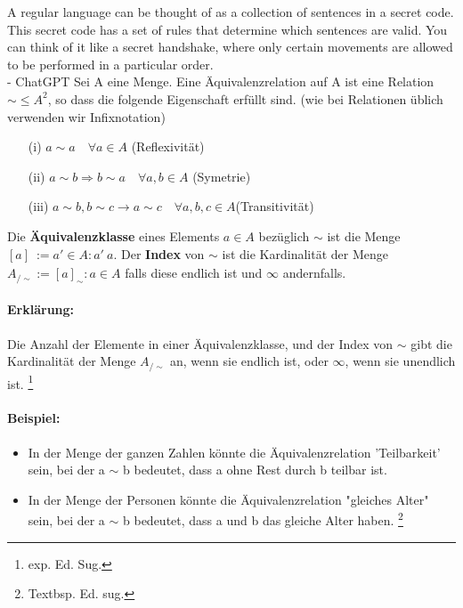 {
  A regular language can be thought of as a collection of sentences in a secret code. This secret code has a set of rules that determine which sentences are valid. You can think of it like a secret handshake, where only certain movements are allowed to be performed in a particular order.\\ \hspace*{\fill} - ChatGPT
}
  Sei A eine Menge. Eine Äquivalenzrelation auf A ist eine Relation \(\sim \leq A^{2}\), so dass die folgende Eigenschaft erfüllt sind. (wie bei Relationen üblich verwenden wir Infixnotation)
  \begin{itemize}
    \item [(i)] \(a \sim a \quad \forall a \in A\)  (Reflexivität)
    \item [(ii)] \(a \sim b \Rightarrow  b \sim a \quad \forall a, b \in A\) (Symetrie)
    \item [(iii)] \(a \sim b, b \sim c \rightarrow a \sim c \quad \forall a, b, c \in A\)(Transitivität)
  \end{itemize}
  Die \textbf{Äquivalenzklasse} eines Elements \(a \in A\) bezüglich \(\sim\) ist die Menge \([a]_{~} := {a' \in A : a' ~a}\). Der \textbf{Index} von \(\sim\) ist die Kardinalität der Menge \(A_{/\sim} := {[a]_{\sim} : a \in A}\) falls diese endlich ist und \(\infty\) andernfalls.

  \paragraph*{Erklärung:}
    Die Anzahl der Elemente in einer Äquivalenzklasse, und der Index von \(\sim\) gibt die Kardinalität der Menge \(A_{/\sim}\) an, wenn sie endlich ist, oder \(\infty\), wenn sie unendlich ist. \footnote{exp. Ed. Sug.}

  \paragraph*{Beispiel:}
  \begin{itemize}
    \item In der Menge der ganzen Zahlen könnte die Äquivalenzrelation 'Teilbarkeit' sein, bei der a \(\sim\) b bedeutet, dass a ohne Rest durch b teilbar ist.
    \item In der Menge der Personen könnte die Äquivalenzrelation "gleiches Alter" sein, bei der a \(\sim\) b bedeutet, dass a und b das gleiche Alter haben. \footnote{Textbsp. Ed. sug.}
  \end{itemize}


